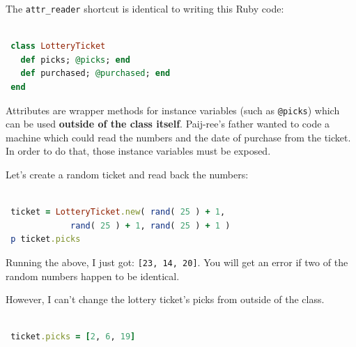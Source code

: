 \documentclass[10pt,twoside]{report}
\begin{document}
The \lstinline[breaklines=true]|attr_reader| shortcut is identical to
writing this Ruby code:


\begin{lstlisting}[basicstyle=\ttfamily\color{basiccolor},
    commentstyle = \ttfamily\color{commentcolor},
    keywordstyle=\ttfamily\color{keywordscolor},
    stringstyle=\color{stringcolor},
    language=Ruby,
    basicstyle=\small\ttfamily,
    showstringspaces=false,
  ]

 class LotteryTicket
   def picks; @picks; end
   def purchased; @purchased; end
 end

\end{lstlisting}


Attributes are wrapper methods for instance variables (such as
\lstinline[breaklines=true]|@picks|) which can be used {\bf outside of
  the class itself}.  Paij-ree's father wanted to code a machine which
could read the numbers and the date of purchase from the ticket.  In
order to do that, those instance variables must be exposed.

Let's create a random ticket and read back the numbers:


\begin{lstlisting}[basicstyle=\ttfamily\color{basiccolor},
    commentstyle = \ttfamily\color{commentcolor},
    keywordstyle=\ttfamily\color{keywordscolor},
    stringstyle=\color{stringcolor},
    language=Ruby,
    basicstyle=\small\ttfamily,
    showstringspaces=false,
  ]

 ticket = LotteryTicket.new( rand( 25 ) + 1,
             rand( 25 ) + 1, rand( 25 ) + 1 )
 p ticket.picks

\end{lstlisting}


Running the above, I just got: 
\lstinline[breaklines=true]|[23, 14, 20]|.  
You will get an error if two of the random numbers happen to
be identical.

However, I can't change the lottery ticket's picks from outside of the
class.


\begin{lstlisting}[basicstyle=\ttfamily\color{basiccolor},
    commentstyle = \ttfamily\color{commentcolor},
    keywordstyle=\ttfamily\color{keywordscolor},
    stringstyle=\color{stringcolor},
    language=Ruby,
    basicstyle=\small\ttfamily,
    showstringspaces=false,
  ]

 ticket.picks = [2, 6, 19]

\end{lstlisting}
\end{document}
